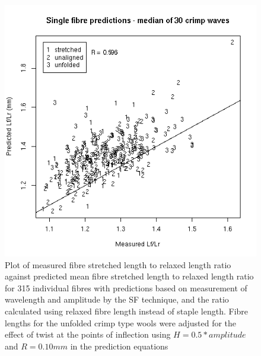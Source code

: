 %

\begin{figure}[!h]
  \centering
  \includegraphics[width=1.1\textwidth]{figpredlftolrfibre.png}
  \caption{Plot of measured fibre stretched length to relaxed length ratio against predicted mean fibre stretched length to relaxed length ratio for 315 individual fibres with predictions based on measurement of wavelength and amplitude by the SF technique, and the ratio calculated using relaxed fibre length instead of staple length. Fibre lengths for the unfolded crimp type wools were adjusted for the effect of twist at the points of inflection using $H = 0.5 * amplitude$ and $R = 0.10 mm$ in the prediction equations }
  \label{fig:predlftolrfibre}
\end{figure}

%

